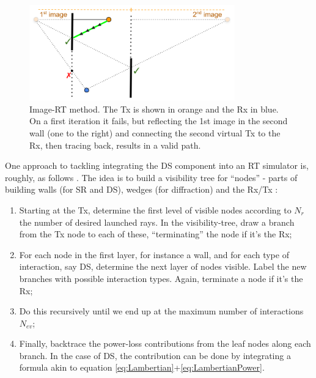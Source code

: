 \documentclass[lettersize,journal]{IEEEtran}
\begin{document}
\begin{figure}[b]
\centering
\includegraphics[width=3.5in]{Image method}
\captionsetup{singlelinecheck=off}
	\caption[]{Image-RT method. The Tx is shown in orange and the Rx in blue. On a first iteration it fails, but reflecting the 1st image in the second wall (one to the right) and connecting the second virtual Tx to the Rx, then tracing back, results in a valid path.}
\label{diag:imageMethod}
\end{figure}

One approach to tackling integrating the DS component into an RT simulator is, roughly, as follows \cite{ref:fieldPrediction}. The idea is to build a visibility tree for  ``nodes'' - parts of building walls (for SR and DS), wedges (for diffraction) and the Rx/Tx :

\begin{enumerate}
\item Starting at the Tx, determine the first level of visible nodes according to $N_r$ the number of desired launched rays. In the visibility-tree, draw a branch from the Tx node to each of these, ``terminating'' the node if it's the Rx;
\item For each node in the first layer, for instance a wall, and for each type of interaction, say DS, determine the next layer of nodes visible. Label the new branches with possible interaction types. Again, terminate a node if it's the Rx;
\item Do this recursively until we end up at the maximum number of interactions $N_{ev}$; 
\item Finally, backtrace the power-loss contributions from the leaf nodes along each branch. In the case of DS, the contribution can be done by integrating a formula akin to equation \eqref{eq:Lambertian}+\eqref{eq:LambertianPower}.
\end{enumerate}

\end{document}
